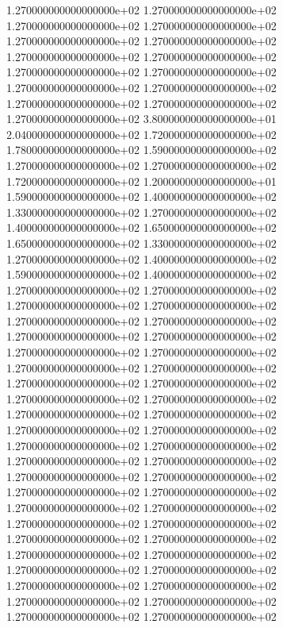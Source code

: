 1.270000000000000000e+02 1.270000000000000000e+02 1.270000000000000000e+02 1.270000000000000000e+02 1.270000000000000000e+02 1.270000000000000000e+02 1.270000000000000000e+02 1.270000000000000000e+02 1.270000000000000000e+02 1.270000000000000000e+02 1.270000000000000000e+02 1.270000000000000000e+02 1.270000000000000000e+02 1.270000000000000000e+02 1.270000000000000000e+02 3.800000000000000000e+01 2.040000000000000000e+02 1.720000000000000000e+02 1.780000000000000000e+02 1.590000000000000000e+02 1.270000000000000000e+02 1.270000000000000000e+02 1.720000000000000000e+02 1.200000000000000000e+01 1.590000000000000000e+02 1.400000000000000000e+02 1.330000000000000000e+02 1.270000000000000000e+02 1.400000000000000000e+02 1.650000000000000000e+02 1.650000000000000000e+02 1.330000000000000000e+02 1.270000000000000000e+02 1.400000000000000000e+02 1.590000000000000000e+02 1.400000000000000000e+02 1.270000000000000000e+02 1.270000000000000000e+02 1.270000000000000000e+02 1.270000000000000000e+02 1.270000000000000000e+02 1.270000000000000000e+02 1.270000000000000000e+02 1.270000000000000000e+02 1.270000000000000000e+02 1.270000000000000000e+02 1.270000000000000000e+02 1.270000000000000000e+02 1.270000000000000000e+02 1.270000000000000000e+02 1.270000000000000000e+02 1.270000000000000000e+02 1.270000000000000000e+02 1.270000000000000000e+02 1.270000000000000000e+02 1.270000000000000000e+02 1.270000000000000000e+02 1.270000000000000000e+02 1.270000000000000000e+02 1.270000000000000000e+02 1.270000000000000000e+02 1.270000000000000000e+02 1.270000000000000000e+02 1.270000000000000000e+02 1.270000000000000000e+02 1.270000000000000000e+02 1.270000000000000000e+02 1.270000000000000000e+02 1.270000000000000000e+02 1.270000000000000000e+02 1.270000000000000000e+02 1.270000000000000000e+02 1.270000000000000000e+02 1.270000000000000000e+02 1.270000000000000000e+02 1.270000000000000000e+02 1.270000000000000000e+02 1.270000000000000000e+02 1.270000000000000000e+02 1.270000000000000000e+02
